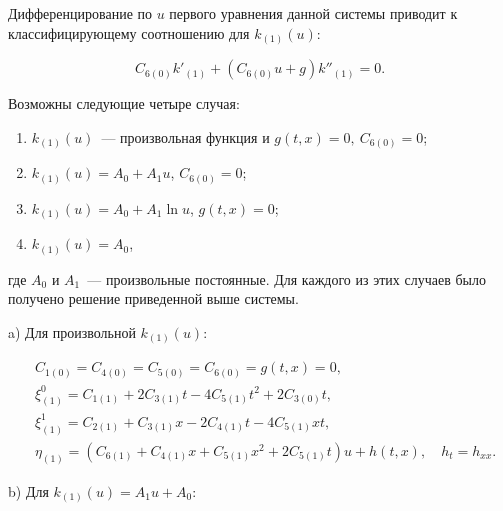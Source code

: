 Дифференцирование по $u$ первого уравнения данной системы приводит к классифицирующему соотношению для $k_{(1)}(u)$:

$$

C_{6(0)} k'_{(1)} + (C_{6(0)} u + g)k''_{(1)}=0. 

$$

Возможны следующие четыре случая:

\begin{enumerate}[label={\alph*)}]

	\item $k_{(1)}(u)$~--- произвольная функция и $g(t,x)=0, \ C_{6(0)}=0$;

	\item $k_{(1)}(u)=A_0+A_1 u$, $C_{6(0)}=0$;

	\item $k_{(1)}(u)=A_0+A_1 \ln u$, $g(t,x)=0$;

	\item $k_{(1)}(u)=A_0$,

\end{enumerate}

где $A_0$ и $A_1$~--- произвольные постоянные. Для каждого из этих случаев было получено решение приведенной выше системы. 



a) Для произвольной $k_{(1)}(u)$:

\begin{align*}

& C_{1(0)}=C_{4(0)}=C_{5(0)}=C_{6(0)}=g(t,x)=0, \\

& \xi^0_{(1)} = C_{1(1)}+2C_{3(1)}t-4C_{5(1)} t^2+2C_{3(0)}t, \\

& \xi^1_{(1)} = C_{2(1)}+C_{3(1)} x -2C_{4(1)} t-4C_{5(1)} xt, \\

& \eta_{(1)} = (C_{6(1)}+C_{4(1)} x +C_{5(1)} x^2 +2 C_{5(1)} t)u+h(t,x), \quad h_t=h_{xx}.

\end{align*}



b) Для $k_{(1)}(u)=A_1 u+A_0$:

